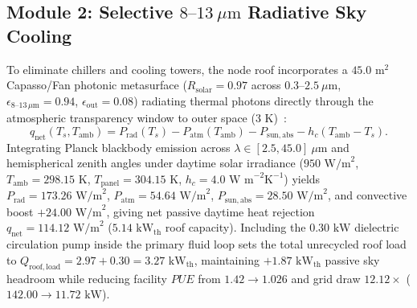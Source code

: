 \documentclass[10pt,twocolumn,a4paper]{article}
\begin{document}
\subsection{Module 2: Selective $8\text{--}13\ \mu\text{m}$ Radiative Sky Cooling}
To eliminate chillers and cooling towers, the node roof incorporates a $45.0\text{ m}^2$ Capasso/Fan photonic metasurface ($R_{\mathrm{solar}} = 0.97$ across $0.3\text{--}2.5\ \mu\text{m}$, $\epsilon_{8\text{--}13\,\mu\mathrm{m}} = 0.94$, $\epsilon_{\mathrm{out}} = 0.08$) radiating thermal photons directly through the atmospheric transparency window to outer space ($3\text{ K}$)~\cite{raman2014}:
\begin{equation}
q_{\mathrm{net}}(T_s, T_{\mathrm{amb}}) = P_{\mathrm{rad}}(T_s) - P_{\mathrm{atm}}(T_{\mathrm{amb}}) - P_{\mathrm{sun,abs}} - h_c(T_{\mathrm{amb}} - T_s).
\end{equation}
Integrating Planck blackbody emission across $\lambda \in [2.5, 45.0]\ \mu\text{m}$ and hemispherical zenith angles under daytime solar irradiance ($950\text{ W/m}^2$, $T_{\mathrm{amb}} = 298.15\text{ K}$, $T_{\mathrm{panel}} = 304.15\text{ K}$, $h_c = 4.0\text{ W m}^{-2}\text{K}^{-1}$) yields $P_{\mathrm{rad}} = 173.26\text{ W/m}^2$, $P_{\mathrm{atm}} = 54.64\text{ W/m}^2$, $P_{\mathrm{sun,abs}} = 28.50\text{ W/m}^2$, and convective boost $+24.00\text{ W/m}^2$, giving net passive daytime heat rejection $q_{\mathrm{net}} = 114.12\text{ W/m}^2$ ($5.14\text{ kW}_{\mathrm{th}}$ roof capacity). Including the $0.30\text{ kW}$ dielectric circulation pump inside the primary fluid loop sets the total unrecycled roof load to $Q_{\mathrm{roof,load}} = 2.97 + 0.30 = 3.27\text{ kW}_{\mathrm{th}}$, maintaining $+1.87\text{ kW}_{\mathrm{th}}$ passive sky headroom while reducing facility $PUE$ from $1.42 \to 1.026$ and grid draw $12.12\times$ ($142.00 \to 11.72\text{ kW}$).
\end{document}
